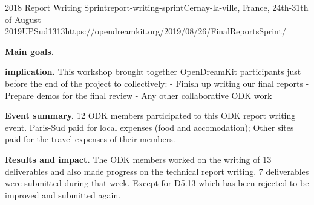 \begin{event}{2018 Report Writing Sprint}{report-writing-sprint}{Cernay-la-ville, France, 24th-31th of August 2019}{UPSud}{13}{13}{https://opendreamkit.org/2019/08/26/FinalReportsSprint/}

\textbf{Main goals.} 

\textbf{\ODK implication.} This workshop brought together OpenDreamKit participants just before the end of the project to collectively:
- Finish up writing our final reports
- Prepare demos for the final review
- Any other collaborative ODK work

\textbf{Event summary.} 
12 ODK members participated to this ODK report writing event. Paris-Sud paid for local expenses (food and accomodation); 
Other sites paid for the travel expenses of their members.

\textbf{Results and impact.}
The ODK members worked on the writing of 13 deliverables and also made progress on the technical report writing. 
7 deliverables were submitted during that week. Except for D5.13 which has been rejected to be improved and submitted again. 

\end{event}
